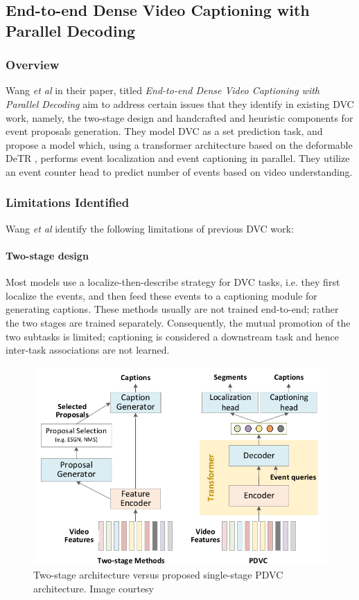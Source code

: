 \subsection{End-to-end Dense Video Captioning with Parallel Decoding}

\subsubsection{Overview}
\par Wang \textit{et al} in their paper, titled \textit{End-to-end Dense Video Captioning with Parallel Decoding} \cite{wang2021endtoend} aim to address certain issues that they identify in existing DVC work, namely, the two-stage design and handcrafted and heuristic components for event proposals generation. They model DVC as a set prediction task, and propose a model which, using a transformer architecture based on the deformable DeTR \cite{}, performs event localization and event captioning in parallel. They utilize an event counter head to predict number of events based on video understanding.

\subsubsection{Limitations Identified}
\par Wang \textit{et al} identify the following limitations of previous DVC work:
\paragraph{Two-stage design} Most models use a localize-then-describe strategy for DVC tasks, i.e. they first localize the events, and then feed these events to a captioning module for generating captions. These methods usually are not trained end-to-end; rather the two stages are trained separately. Consequently, the mutual promotion of the two subtasks is limited; captioning is considered a downstream task and hence inter-task associations are not learned.

\begin{figure}[h]
\centering
\includegraphics[width=0.5\linewidth]{assets/img/pdvc/single-stage.png}
\caption{Two-stage architecture versus proposed single-stage PDVC architecture. Image courtesy \cite{wang2021endtoend}}
\end{figure}

